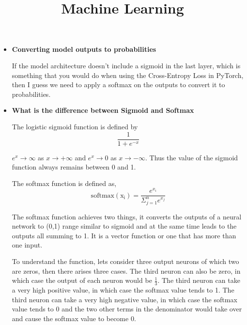\documentclass{../template/texnote}
\title{Machine Learning}
\begin{document}
    \maketitle {}
\begin{itemize}
	\item \textbf{Converting model outputs to probabilities}

		If the model architecture doesn't include a sigmoid in the last layer, which is something that you would do when using the Cross-Entropy Loss in PyTorch, then I guess we need to apply a softmax on the outputs to convert it to probabilities.
	\item \textbf{What is the difference between Sigmoid and Softmax}

The logistic sigmoid function is defined by 
\[ \frac{1}{1+e^{-x}}\]

\(e^x \to \infty \) as \(x \to +\infty\) and \(e^x \to 0 \) as \(x \to -\infty\).
Thus the value of the sigmoid function always remains between 0 and 1.

The softmax function is defined as,
\[ \mathrm{softmax(x_i)} = \frac{e^{x_i}}{\Sigma_{j=1}^{n} e^{x_j}} \]

The softmax function achieves two things, it converts the outputs of a neural network to (0,1) range similar to sigmoid and at the same time leads to the outputs all summing to 1.
It is a vector function or one that has more than one input.

To understand the function, lets consider three output neurons of which two are zeros, then there arises three cases.
The third neuron can also be zero, in which case the output of each neuron would be \( \frac{1}{3}\).
The third neuron can take a very high positive value, in which case the softmax value tends to 1.
The third neuron can take a very high negative value, in which case the softmax value tends to 0 and the two other terms in the denominator would take over and cause the softmax value to become 0.

\end{itemize}
    \printbibliography
\end{document}
